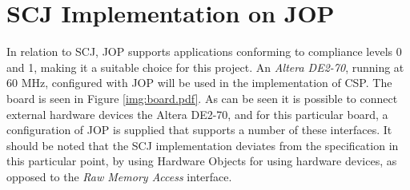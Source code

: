 \section{SCJ Implementation on JOP} %
\label{sec:scj_implementation_on_jop}
In relation to SCJ, JOP supports applications conforming to compliance levels 0 and 1, making it a suitable choice for this project. An \textit{Altera DE2-70}, running at 60 MHz, configured with JOP will be used in the implementation of CSP. The board is seen in Figure \ref{img:board.pdf}. As can be seen it is possible to connect external hardware devices the Altera DE2-70, and for this particular board, a configuration of JOP is supplied that supports a number of these interfaces.
It should be noted that the SCJ implementation deviates from the specification in this particular point, by using Hardware Objects\cite{Schoeberl:2011:HAL:2043662.2043666, Schoeberl:2008:HOJ:1371608.1372849} for using hardware devices, as opposed to the \textit{Raw Memory Access} interface.
